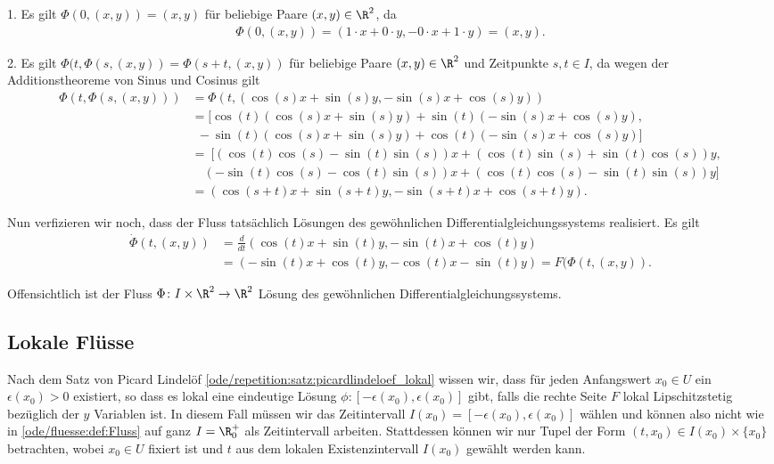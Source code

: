 \documentclass[letterpaper,10pt,english]{jupyterBook}
\begin{document}
\begin{example}{}{}
\par
1. Es gilt \(\Phi(0, (x,y)) = (x,y)\) für beliebige Paare \((x,y) \in \R^2\), da
\begin{align*}
\Phi(0, (x,y)) = (1\cdot x + 0\cdot y, - 0 \cdot x + 1 \cdot y) = (x,y).
\end{align*}
\par
2. Es gilt \(\Phi(t, \Phi(s,(x,y)) = \Phi(s + t, (x,y))\) für beliebige Paare \((x,y) \in \R^2\) und Zeitpunkte \(s,t \in I\), da wegen der Additionstheoreme von Sinus und Cosinus gilt
\begin{align*}
\Phi(t, \Phi(s,(x,y))) &= \Phi(t, (\cos(s)x + \sin(s)y, -\sin(s)x + \cos(s)y)) \\
&= [\cos(t)(\cos(s)x + \sin(s)y) + \sin(t)(-\sin(s)x + \cos(s)y), \\
& \ \ -\sin(t)(\cos(s)x + \sin(s)y) + \cos(t)(-\sin(s)x + \cos(s)y)]\\
&= \ [ (\cos(t)\cos(s) - \sin(t)\sin(s))x + (\cos(t)\sin(s) + \sin(t)\cos(s))y, \\
& \quad (-\sin(t)\cos(s) - \cos(t)\sin(s))x + (\cos(t)\cos(s) - \sin(t)\sin(s))y ] \\
&= (\cos(s+t)x + \sin(s+t)y, -\sin(s+t)x + \cos(s+t)y).
\end{align*}
\par
Nun verfizieren wir noch, dass der Fluss tatsächlich Lösungen des gewöhnlichen Differentialgleichungssystems realisiert.
Es gilt
\begin{align*}
\dot{\Phi}(t, (x,y)) &= \frac{d}{dt}(\cos(t)x + \sin(t)y, -\sin(t)x + \cos(t)y) \\
&= (-\sin(t)x + \cos(t)y, -\cos(t)x - \sin(t)y) = F(\Phi(t,(x,y)).
\end{align*}
\par
Offensichtlich ist der Fluss \(\Phi \colon I \times \R^2 \rightarrow \R^2\) Lösung des gewöhnlichen Differentialgleichungssystems.
\end{example}


\subsection{Lokale Flüsse}
\label{\detokenize{ode/fluesse:lokale-flusse}}
\par
Nach dem Satz von Picard Lindelöf \cref{ode/repetition:satz:picardlindeloef_lokal} wissen wir, dass für jeden Anfangswert \(x_0\in U\) ein \(\epsilon(x_0)>0\) existiert, so dass es lokal eine eindeutige Lösung \(\phi: [-\epsilon(x_0), \epsilon(x_0)]\) gibt, falls die rechte Seite \(F\) lokal Lipschitzstetig bezüglich der \(y\) Variablen ist.
In diesem Fall müssen wir das Zeitintervall \(I(x_0)=[-\epsilon(x_0), \epsilon(x_0)]\) wählen und können also nicht wie in \cref{ode/fluesse:def:Fluss} auf ganz \(I = \R^+_0\) als Zeitintervall arbeiten.
Stattdessen können wir nur Tupel der Form \((t, x_0) \in I(x_0) \times \{x_0\}\) betrachten, wobei \(x_0\in U\) fixiert ist und \(t\) aus dem lokalen Existenzintervall \(I(x_0)\) gewählt werden kann.
\end{document}
